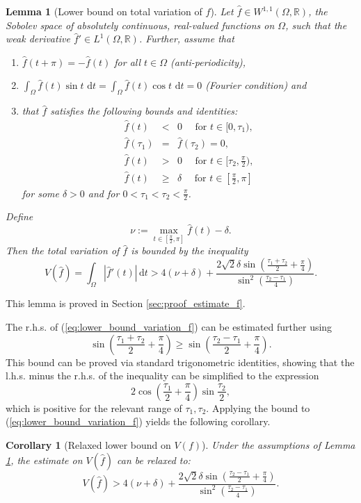 \documentclass{article}
\newtheorem{corollary}[definition]{Corollary}
\newtheorem{lemma}[definition]{Lemma}
\newcommand{\dt}{\,\mathrm{d}t}
\newcommand{\R}{\mathbb{R}\xspace}
\begin{document}
\begin{lemma}[Lower bound on total variation of $f$] \label{lem:lower_bounb_variation_f}
    Let $\hat f \in W^{1,1}(\Omega, \R)$, the Sobolev space of absolutely continuous, real-valued functions on $\Omega$, such that the weak derivative $\hat f' \in L^1(\Omega, \R)$. Further, assume that
    \begin{enumerate}
        \item  $\hat f(t + \pi) = -\hat f(t)$ for all $t\in\Omega$ (anti-periodicity),
        \item $\int_\Omega \hat f(t) \sin t\,\dt = \int_\Omega \hat f(t) \cos t\,\dt = 0$ (Fourier condition) and %
        \item  that $\hat f$ satisfies the following bounds and identities:
        \begin{eqnarray*}
            \hat f(t) &<& 0 \quad \text{ for } t \in [0,\tau_1),\\
            \hat f(\tau_1) &=& \hat f(\tau_2) = 0,\\
            \hat f(t) &>& 0 \quad  \text{ for } t \in [\tau_2,\frac{\pi}{2}),\\
            \hat f(t) &\ge& \delta \quad  \text{ for } t \in [\frac{\pi}{2},\pi]
        \end{eqnarray*}
        for some $\delta > 0$ and for $0 < \tau_1 < \tau_2 < \frac\pi2$.
    \end{enumerate}
    Define
    \[\nu := \max_{t \in [\frac\pi 2,\pi]} \hat f(t) - \delta.\]
    Then the total variation of $\hat f$ is bounded by the inequality
    \begin{equation} \label{eq:lower_bound_variation_f}
        V(\hat f) = \int_\Omega |\hat f'(t)| \dt > 4(\nu+\delta) + \frac{2\sqrt2\delta\sin(\frac{\tau_1 + \tau_2}{2} + \frac\pi4)}{\sin^2(\frac{\tau_2 - \tau_1}{4})}.
    \end{equation}
\end{lemma}
This lemma is proved in Section \ref{sec:proof_estimate_f}.

The r.h.s. of (\ref{eq:lower_bound_variation_f}) can be estimated further using
\[\sin\left(\frac{\tau_1 + \tau_2}{2} + \frac\pi4\right) \ge \sin\left(\frac{\tau_2 - \tau_1}{2} + \frac\pi4\right).\]
This bound can be proved via standard trigonometric identities, showing that the l.h.s. minus the r.h.s. of the inequality can be simplified to the expression
\[2 \cos\left(\frac{\tau_1}2+\frac\pi 4\right)  \sin\frac{\tau_2}2,\]
which is positive for the relevant range of $\tau_1, \tau_2.$
Applying the bound to (\ref{eq:lower_bound_variation_f}) yields the following corollary.
\begin{corollary}[Relaxed lower bound on $V(f)$] \label{cor:relaxed_bound_variation_f}
    Under the assumptions of Lemma \ref{lem:lower_bounb_variation_f}, the estimate on $V(\hat f)$ can be relaxed to:
    \begin{equation} \label{eq:relaxed_bound_variation_f}
        V(\hat f) > 4(\nu + \delta) +\frac{ 2\sqrt 2\delta \sin(\frac{\tau_2 - \tau_1}{2} + \frac\pi4)}{\sin^2(\frac{\tau_2 - \tau_1}{4})}.
    \end{equation}
\end{corollary}
\end{document}
